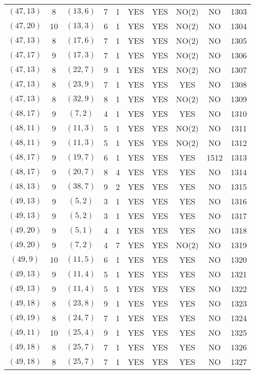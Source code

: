 \begin{longtable}{|c|c|c|c|c|c|c|c|c|c|}
$(47, 13)$ & 8 & $(13, 6)$ & 7 & 1 & YES & YES & NO(2) & NO & 1303\\
$(47, 20)$ & 10 & $(13, 3)$ & 6 & 1 & YES & YES & NO(2) & NO & 1304\\
$(47, 13)$ & 8 & $(17, 6)$ & 7 & 1 & YES & YES & NO(2) & NO & 1305\\
$(47, 17)$ & 9 & $(17, 3)$ & 7 & 1 & YES & YES & NO(2) & NO & 1306\\
$(47, 13)$ & 8 & $(22, 7)$ & 9 & 1 & YES & YES & NO(2) & NO & 1307\\
$(47, 13)$ & 8 & $(23, 9)$ & 7 & 1 & YES & YES & YES & NO & 1308\\
$(47, 13)$ & 8 & $(32, 9)$ & 8 & 1 & YES & YES & NO(2) & NO & 1309\\
$(48, 17)$ & 9 & $(7, 2)$ & 4 & 1 & YES & YES & YES & NO & 1310\\
$(48, 11)$ & 9 & $(11, 3)$ & 5 & 1 & YES & YES & NO(2) & NO & 1311\\
$(48, 11)$ & 9 & $(11, 3)$ & 5 & 1 & YES & YES & NO(2) & NO & 1312\\
$(48, 17)$ & 9 & $(19, 7)$ & 6 & 1 & YES & YES & YES & 1512 & 1313\\
$(48, 17)$ & 9 & $(20, 7)$ & 8 & 4 & YES & YES & YES & NO & 1314\\
$(48, 13)$ & 9 & $(38, 7)$ & 9 & 2 & YES & YES & YES & NO & 1315\\
$(49, 13)$ & 9 & $(5, 2)$ & 3 & 1 & YES & YES & YES & NO & 1316\\
$(49, 13)$ & 9 & $(5, 2)$ & 3 & 1 & YES & YES & YES & NO & 1317\\
$(49, 20)$ & 9 & $(5, 1)$ & 4 & 1 & YES & YES & YES & NO & 1318\\
$(49, 20)$ & 9 & $(7, 2)$ & 4 & 7 & YES & YES & NO(2) & NO & 1319\\
$(49, 9)$ & 10 & $(11, 5)$ & 6 & 1 & YES & YES & YES & NO & 1320\\
$(49, 13)$ & 9 & $(11, 4)$ & 5 & 1 & YES & YES & YES & NO & 1321\\
$(49, 13)$ & 9 & $(11, 4)$ & 5 & 1 & YES & YES & YES & NO & 1322\\
$(49, 18)$ & 8 & $(23, 8)$ & 9 & 1 & YES & YES & YES & NO & 1323\\
$(49, 19)$ & 8 & $(24, 7)$ & 7 & 1 & YES & YES & YES & NO & 1324\\
$(49, 11)$ & 10 & $(25, 4)$ & 9 & 1 & YES & YES & YES & NO & 1325\\
$(49, 18)$ & 8 & $(25, 7)$ & 7 & 1 & YES & YES & YES & NO & 1326\\
$(49, 18)$ & 8 & $(25, 7)$ & 7 & 1 & YES & YES & YES & NO & 1327\\

\end{longtable}
